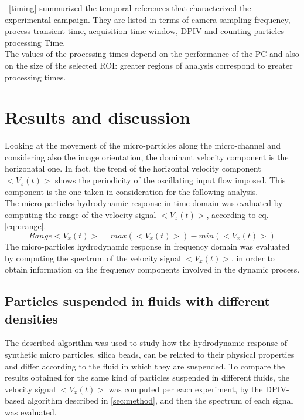 \documentclass[journal]{IEEEtran}
\theoremstyle{definition}
\theoremstyle{remark}
\begin{document}
~\tab\ref{timing} summurized the temporal references that characterized the experimental campaign. They are listed in terms of camera sampling frequency, process transient time, acquisition time window, DPIV and counting particles processing Time. 
\\The values of the processing times depend on the performance of the PC and also on the size of the selected ROI: greater regions of analysis correspond to greater processing times.


\section{Results and discussion}

Looking at the movement of the micro-particles along the micro-channel and considering also the image orientation, the dominant velocity component is the horizonatal one. In fact, the trend of the horizontal velocity component $<V_x(t)>$ shows the periodicity of the oscillating input flow imposed. This component is the one taken in consideration for the following analysis. 
\\The micro-particles hydrodynamic response in time domain was evaluated by computing the range of the velocity signal $<V_x(t)>$, according to eq. \ref{eqn:range}. 
\begin{equation}
	\label{eqn:range}
	Range<V_x(t)>=max(<V_x(t)>)-min(<V_x(t)>)
\end{equation}
The micro-particles hydrodynamic response in frequency domain was evaluated by computing the spectrum of the velocity signal $<V_x(t)>$, in order to obtain information on the frequency components involved in the dynamic process.

\subsection{Particles suspended in fluids with different densities}

The described algorithm was used to study how the hydrodynamic response of synthetic micro particles, silica beads, can be related to their physical properties and differ according to the fluid in which they are suspended. To compare the results obtained for the same kind of particles suspended in different fluids, the velocity signal $<V_x(t)>$ was computed per each experiment, by the DPIV-based algorithm described in \sect\ref{sec:method}, and then the spectrum of each signal was evaluated. 
\end{document}
